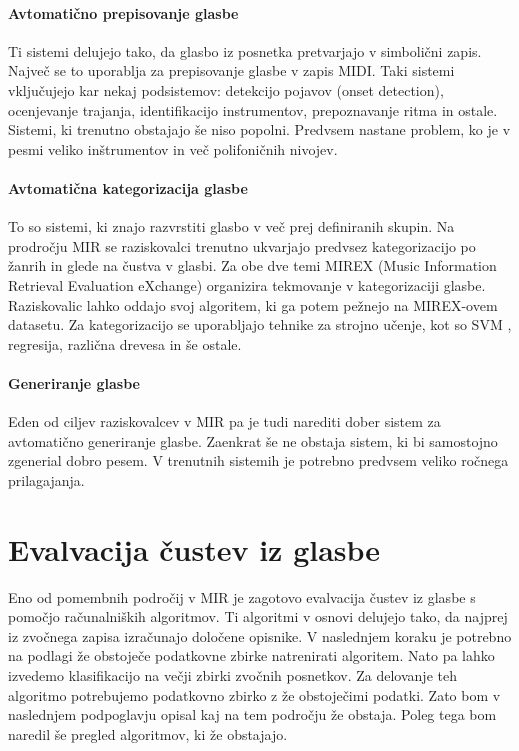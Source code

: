 \documentclass[a4paper, 12pt]{book}
\begin{document}
{\paragraph{Avtomatično prepisovanje glasbe}

Ti sistemi delujejo tako, da glasbo iz posnetka pretvarjajo v simbolični zapis. Največ se to uporablja za prepisovanje glasbe v zapis MIDI. Taki sistemi vključujejo kar nekaj podsistemov: detekcijo pojavov (onset detection), ocenjevanje trajanja, identifikacijo instrumentov, prepoznavanje ritma in ostale. Sistemi, ki trenutno obstajajo še niso popolni. Predvsem nastane problem, ko je v pesmi veliko inštrumentov in več polifoničnih nivojev. 

\paragraph{Avtomatična kategorizacija glasbe}

To so sistemi, ki znajo razvrstiti glasbo v več prej definiranih skupin. Na prodročju MIR se raziskovalci trenutno ukvarjajo predvsez kategorizacijo po žanrih in glede na čustva v glasbi. Za obe dve temi MIREX (Music Information Retrieval Evaluation eXchange) organizira tekmovanje v kategorizaciji glasbe. Raziskovalic lahko oddajo svoj algoritem, ki ga potem pežnejo na MIREX-ovem datasetu. Za kategorizacijo se uporabljajo tehnike za strojno učenje, kot so SVM \cite{ben2010user}, regresija, različna drevesa in še ostale.

\paragraph{Generiranje glasbe}

Eden od ciljev raziskovalcev v MIR pa je tudi narediti dober sistem za avtomatično generiranje glasbe. Zaenkrat še ne obstaja sistem, ki bi samostojno zgenerial dobro pesem. V trenutnih sistemih je potrebno predvsem veliko ročnega prilagajanja. 

\section{Evalvacija čustev iz glasbe}

Eno od pomembnih področij v MIR je zagotovo evalvacija čustev iz glasbe s pomočjo računalniških algoritmov. Ti algoritmi v osnovi delujejo tako, da najprej iz zvočnega zapisa izračunajo določene opisnike. V naslednjem koraku je potrebno na podlagi že obstoječe podatkovne zbirke natrenirati algoritem. Nato pa lahko izvedemo klasifikacijo na večji zbirki zvočnih posnetkov. Za delovanje teh algoritmo potrebujemo podatkovno zbirko z že obstoječimi podatki. Zato bom v naslednjem podpoglavju opisal kaj na tem področju že obstaja. Poleg tega bom naredil še pregled algoritmov, ki že obstajajo.

}
\end{document}
